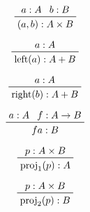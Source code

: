 \documentclass{beamer}
\begin{document}
\begin{frame}
\begin{center}
\begin{minipage}[b]{0.25\linewidth}
\begin{displaymath}
        \prftree[r]{}{a:A}{b:B}{(a,b):A\times B}
      \end{displaymath}
    \end{minipage}
    \begin{minipage}[b]{0.25\linewidth}
      \begin{displaymath}
        \prftree[r]{}{a:A}{\operatorname{left}(a):A+B}
      \end{displaymath}
    \end{minipage}
    \begin{minipage}[b]{0.30\linewidth}
      \begin{displaymath}
        \prftree[r]{}{a:A}{\operatorname{right}(b):A+B}
      \end{displaymath}
    \end{minipage}
    \begin{minipage}[b]{0.25\linewidth}
      \begin{displaymath}
        \prftree[r]{}{a:A}{f:A\to B}{f a:B}
      \end{displaymath}
    \end{minipage}
    \begin{minipage}[b]{0.20\linewidth}
      \begin{displaymath}
        \prftree[r]{}{p:A\times B}{\operatorname{proj}_1(p):A}
      \end{displaymath}
    \end{minipage}
    \begin{minipage}[b]{0.20\linewidth}
      \begin{displaymath}
        \prftree[r]{}{p:A\times B}{\operatorname{proj}_2(p):B}
      \end{displaymath}
    \end{minipage}
  \end{center}


\end{frame}
\end{document}
